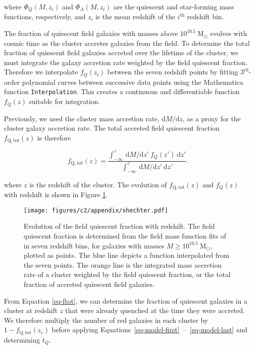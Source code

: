 where $\Phi_Q(M, z_i)$ and $\Phi_A(M, z_i)$ are the quiescent and star-forming mass functions, respectively, and $z_i$ is the mean redshift of the $i^{\mathrm{th}}$ redshift bin.

The fraction of quiescent field galaxies with masses above $10^{10.5}~ \mathrm{M}_\odot$ evolves with cosmic time as the cluster accretes galaxies from the field.
To determine the total fraction of quiescent field galaxies accreted over the lifetime of the cluster, we must integrate the galaxy accretion rate weighted by the field quiescent fraction.
Therefore we interpolate $f_Q(z_i)$ between the seven redshift points by fitting $3^{\mathrm{rd}}$-order polynomial curves between successive data points using the Mathematica function \texttt{Interpolation}.
This creates a continuous and differentiable function $f_Q(z)$ suitable for integration.

Previously, we used the cluster mass accretion rate, $\mathrm{d}M/\mathrm{d}z$, as a proxy for the cluster galaxy accretion rate.
The total accreted field quiescent fraction $f_\mathrm{Q,tot}(z)$ is therefore

\begin{equation}\label{eq-ftot}
f_\mathrm{Q,tot}(z) = \frac{\int_{-\infty}^z~ \mathrm{d}M/\mathrm{d}z'~f_Q(z')~\mathrm{d}z'}{\int_{-\infty}^z~ \mathrm{d}M/\mathrm{d}z'~\mathrm{d}z'}.
\end{equation}

where $z$ is the redshift of the cluster.
The evolution of $f_\mathrm{Q,tot}(z)$ and $f_Q(z)$ with redshift is shown in Figure \ref{fig-a-schechter}.

\begin{figure}
\centering \texttt{[image: figures/c2/appendix/shechter.pdf]}
\caption[Evolution of the field quiescent fraction with redshift]{Evolution of the field quiescent fraction with redshift.
The field quiescent fraction is determined from the field mass function fits of \citet{Muzzin:2013ab} in seven redshift bins, for galaxies with masses $M \geq 10^{10.5}~ \mathrm{M}_\odot$, plotted as points.
The blue line depicts a function interpolated from the seven points.
The orange line is the integrated mass accretion rate of a cluster weighted by the field quiescent fraction, or the total fraction of accreted quiescent field galaxies.
\label{fig-a-schechter}}
\end{figure}

From Equation \ref{eq-ftot}, we can determine the fraction of quiescent galaxies in a cluster at redshift $z$ that were already quenched at the time they were accreted.
We therefore multiply the number of red galaxies in each cluster by $1-f_\mathrm{Q,tot}(z_c)$ before applying Equations~\eqref{eq-model-first}~--~\eqref{eq-model-last} and determining $t_Q$.

